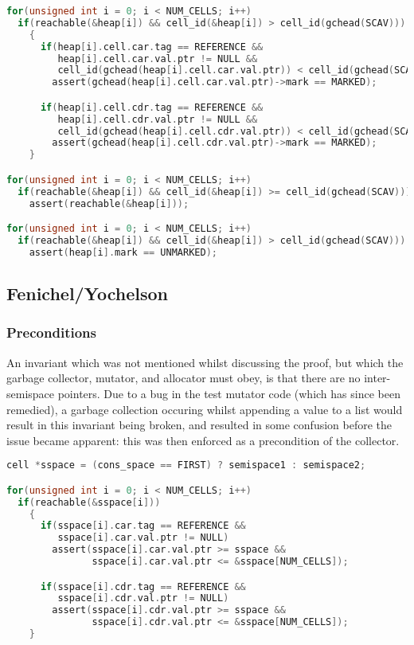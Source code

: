 \begin{lstlisting}[language=C,caption={Armstrong/Virding Invariants}]
for(unsigned int i = 0; i < NUM_CELLS; i++)
  if(reachable(&heap[i]) && cell_id(&heap[i]) > cell_id(gchead(SCAV)))
    {
      if(heap[i].cell.car.tag == REFERENCE &&
         heap[i].cell.car.val.ptr != NULL &&
         cell_id(gchead(heap[i].cell.car.val.ptr)) < cell_id(gchead(SCAV)))
        assert(gchead(heap[i].cell.car.val.ptr)->mark == MARKED);

      if(heap[i].cell.cdr.tag == REFERENCE &&
         heap[i].cell.cdr.val.ptr != NULL &&
         cell_id(gchead(heap[i].cell.cdr.val.ptr)) < cell_id(gchead(SCAV)))
        assert(gchead(heap[i].cell.cdr.val.ptr)->mark == MARKED);
    }

for(unsigned int i = 0; i < NUM_CELLS; i++)
  if(reachable(&heap[i]) && cell_id(&heap[i]) >= cell_id(gchead(SCAV)))
    assert(reachable(&heap[i]));

for(unsigned int i = 0; i < NUM_CELLS; i++)
  if(reachable(&heap[i]) && cell_id(&heap[i]) > cell_id(gchead(SCAV)))
    assert(heap[i].mark == UNMARKED);
\end{lstlisting}

\subsection{Fenichel/Yochelson}
\label{sec:results-impl-c}

\subsubsection{Preconditions}
\label{sec:results-impl-c-pre}

An invariant which was not mentioned whilst discussing the proof, but
which the garbage collector, mutator, and allocator must obey, is that
there are no inter-semispace pointers. Due to a bug in the test
mutator code (which has since been remedied), a garbage collection
occuring whilst appending a value to a list would result in this
invariant being broken, and resulted in some confusion before the
issue became apparent: this was then enforced as a precondition of the
collector.

\begin{lstlisting}[language=C,caption={Fenichel/Yochelson Preconditions}]
cell *sspace = (cons_space == FIRST) ? semispace1 : semispace2;

for(unsigned int i = 0; i < NUM_CELLS; i++)
  if(reachable(&sspace[i]))
    {
      if(sspace[i].car.tag == REFERENCE &&
         sspace[i].car.val.ptr != NULL)
        assert(sspace[i].car.val.ptr >= sspace &&
               sspace[i].car.val.ptr <= &sspace[NUM_CELLS]);

      if(sspace[i].cdr.tag == REFERENCE &&
         sspace[i].cdr.val.ptr != NULL)
        assert(sspace[i].cdr.val.ptr >= sspace &&
               sspace[i].cdr.val.ptr <= &sspace[NUM_CELLS]);
    }
\end{lstlisting}

